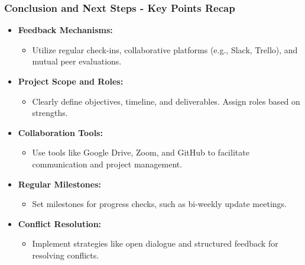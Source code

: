 \documentclass[aspectratio=169]{beamer}
\begin{document}
\begin{frame}[fragile]
  \frametitle{Conclusion and Next Steps - Key Points Recap}
  \begin{itemize}
    \item \textbf{Feedback Mechanisms:} 
    \begin{itemize}
      \item Utilize regular check-ins, collaborative platforms (e.g., Slack, Trello), and mutual peer evaluations.
    \end{itemize}
    
    \item \textbf{Project Scope and Roles:}
    \begin{itemize}
      \item Clearly define objectives, timeline, and deliverables. Assign roles based on strengths.
    \end{itemize}
    
    \item \textbf{Collaboration Tools:}
    \begin{itemize}
      \item Use tools like Google Drive, Zoom, and GitHub to facilitate communication and project management.
    \end{itemize}
    
    \item \textbf{Regular Milestones:}
    \begin{itemize}
      \item Set milestones for progress checks, such as bi-weekly update meetings.
    \end{itemize}
    
    \item \textbf{Conflict Resolution:}
    \begin{itemize}
      \item Implement strategies like open dialogue and structured feedback for resolving conflicts.
    \end{itemize}
  \end{itemize}
\end{frame}
\end{document}
